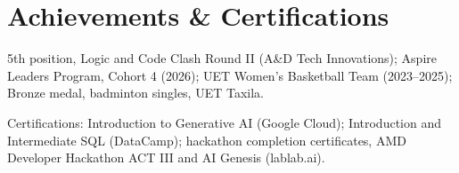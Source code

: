 \documentclass[a4paper,10pt]{article}
\begin{document}
\section{Achievements \& Certifications}
\begin{itemize}[leftmargin=0.18in, itemsep=0pt]
  \small{
  \item 5th position, Logic and Code Clash Round II (A\&D Tech Innovations); Aspire Leaders Program, Cohort 4 (2026); UET Women's Basketball Team (2023--2025); Bronze medal, badminton singles, UET Taxila.
  \item Certifications: Introduction to Generative AI (Google Cloud); Introduction and Intermediate SQL (DataCamp); hackathon completion certificates, AMD Developer Hackathon ACT III and AI Genesis (lablab.ai).
  }
\end{itemize}
\end{document}
